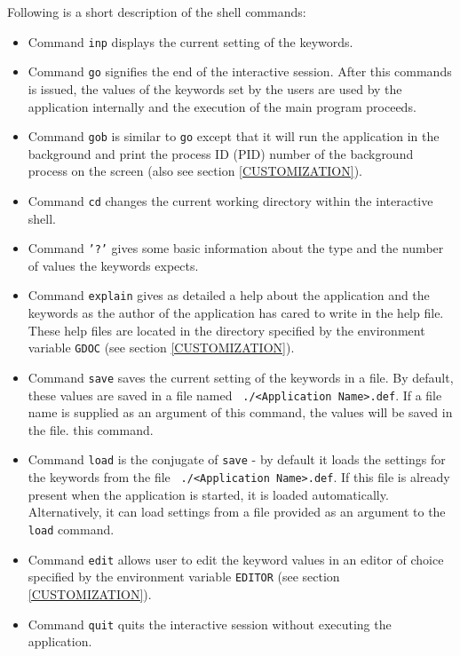 \documentclass[11pt]{article}
\begin{document}
Following is a short description of the shell commands:

\begin{itemize}

\item Command {\tt inp} displays the current setting of the keywords.
  
\item Command {\tt go} signifies the end of the interactive session.
  After this commands is issued, the values of the keywords set by the
  users are used by the application internally and the execution of
  the main program proceeds.
  
\item Command {\tt gob} is similar to {\tt go} except that it will run
  the application in the background and print the process ID (PID)
  number of the background process on the screen (also see section
  \ref{CUSTOMIZATION}).
  
\item Command {\tt cd} changes the current working directory within
  the interactive shell.
  
\item Command {\tt '?'} gives some basic information
  about the type and the number of values the keywords expects.
  
\item Command {\tt explain} gives as detailed a help
  about the application and the keywords as the author of the
  application has cared to write in the help file.  These help files
  are located in the directory specified by the environment variable
  {\tt GDOC} (see section \ref{CUSTOMIZATION}).
  
\item Command {\tt save} saves the current setting of the keywords in
  a file.  By default, these values are saved in a file named {\tt
    ./<Application Name>.def}.  If a file name is supplied as an
  argument of this command, the values will be saved in the file.
  this command.
  
\item Command {\tt load} is the conjugate of {\tt save} - by default
  it loads the settings for the keywords from the file {\tt
    ./<Application Name>.def}.  If this file is already present when
  the application is started, it is loaded automatically.
  Alternatively, it can load settings from a file provided as an
  argument to the {\tt load} command.
  
\item Command {\tt edit} allows user to edit the keyword values in an
  editor of choice specified by the environment variable {\tt EDITOR}
  (see section \ref{CUSTOMIZATION}).
  
\item Command {\tt quit} quits the interactive session without
  executing the application.

\end{itemize}
\end{document}

